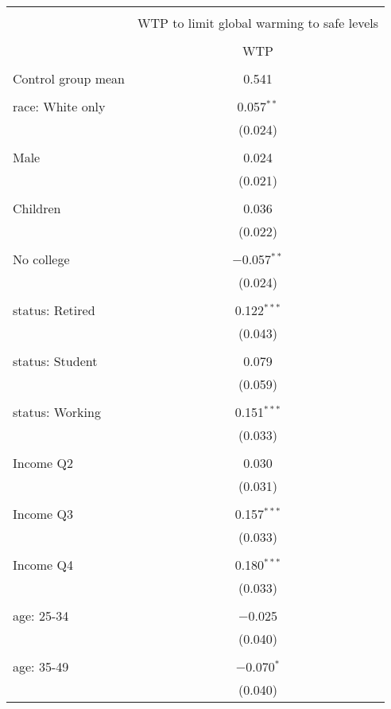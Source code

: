 
\begin{tabular}{@{\extracolsep{5pt}}lc} 
\\[-1.8ex]\hline 
\hline \\[-1.8ex] 
 & \multicolumn{1}{c}{WTP to limit global warming to safe levels} \\ 
\cline{2-2} 
\\[-1.8ex] & WTP \\ 
\hline \\[-1.8ex] 
 Control group mean & 0.541  \\ \hline \\[-1.8ex] race: White only & 0.057$^{**}$ \\ 
  & (0.024) \\ 
  & \\ 
 Male & 0.024 \\ 
  & (0.021) \\ 
  & \\ 
 Children & 0.036 \\ 
  & (0.022) \\ 
  & \\ 
 No college & $-$0.057$^{**}$ \\ 
  & (0.024) \\ 
  & \\ 
 status: Retired & 0.122$^{***}$ \\ 
  & (0.043) \\ 
  & \\ 
 status: Student & 0.079 \\ 
  & (0.059) \\ 
  & \\ 
 status: Working & 0.151$^{***}$ \\ 
  & (0.033) \\ 
  & \\ 
 Income Q2 & 0.030 \\ 
  & (0.031) \\ 
  & \\ 
 Income Q3 & 0.157$^{***}$ \\ 
  & (0.033) \\ 
  & \\ 
 Income Q4 & 0.180$^{***}$ \\ 
  & (0.033) \\ 
  & \\ 
 age: 25-34 & $-$0.025 \\ 
  & (0.040) \\ 
  & \\ 
 age: 35-49 & $-$0.070$^{*}$ \\ 
  & (0.040) \\ 

\end{tabular}
